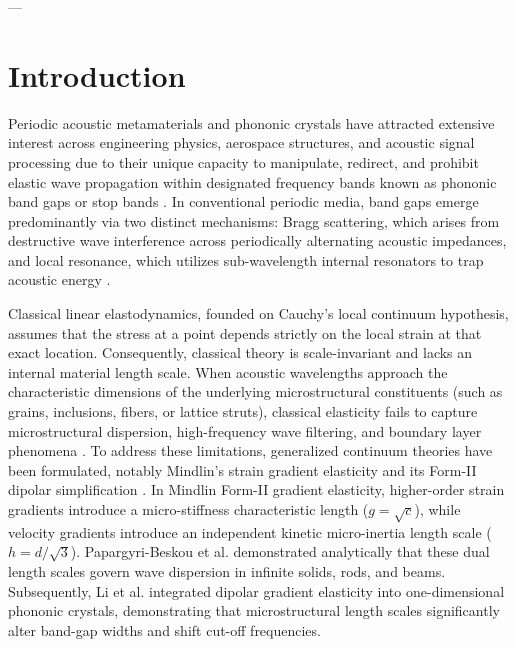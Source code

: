 \documentclass[11pt,a4paper]{article}
\begin{document}
---

\section{Introduction}
\label{sec:intro}

Periodic acoustic metamaterials and phononic crystals have attracted extensive interest across engineering physics, aerospace structures, and acoustic signal processing due to their unique capacity to manipulate, redirect, and prohibit elastic wave propagation within designated frequency bands known as phononic band gaps or stop bands \cite{kushwaha1993acoustic,hussein2014dynamics,brillouin1953wave}. In conventional periodic media, band gaps emerge predominantly via two distinct mechanisms: Bragg scattering, which arises from destructive wave interference across periodically alternating acoustic impedances, and local resonance, which utilizes sub-wavelength internal resonators to trap acoustic energy \cite{hussein2014dynamics}.

Classical linear elastodynamics, founded on Cauchy's local continuum hypothesis, assumes that the stress at a point depends strictly on the local strain at that exact location. Consequently, classical theory is scale-invariant and lacks an internal material length scale. When acoustic wavelengths approach the characteristic dimensions of the underlying microstructural constituents (such as grains, inclusions, fibers, or lattice struts), classical elasticity fails to capture microstructural dispersion, high-frequency wave filtering, and boundary layer phenomena \cite{achenbach1973wave}. To address these limitations, generalized continuum theories have been formulated, notably Mindlin's strain gradient elasticity \cite{mindlin1964microstructure,mindlin1965second} and its Form-II dipolar simplification \cite{askes2011gradient,georgiadis2003wedge,polyzos2003boundary}. In Mindlin Form-II gradient elasticity, higher-order strain gradients introduce a micro-stiffness characteristic length ($g = \sqrt{c}$), while velocity gradients introduce an independent kinetic micro-inertia length scale ($h = d/\sqrt{3}$). Papargyri-Beskou et al. \cite{papargyribeskou2009wave} demonstrated analytically that these dual length scales govern wave dispersion in infinite solids, rods, and beams. Subsequently, Li et al. \cite{li2016band} integrated dipolar gradient elasticity into one-dimensional phononic crystals, demonstrating that microstructural length scales significantly alter band-gap widths and shift cut-off frequencies.
\end{document}
